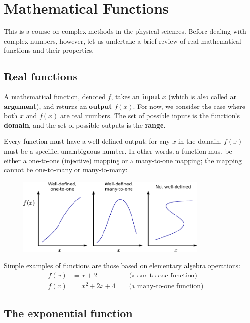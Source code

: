 \documentclass[10pt,a4paper]{article}
\begin{document}
    
\section{Mathematical Functions}
\label{mathematical-functions}

This is a course on complex methods in the physical sciences. Before
dealing with complex numbers, however, let us undertake a brief review
of real mathematical functions and their properties.

\subsection{Real functions}\label{real-functions}

A mathematical function, denoted $f$, takes an \textbf{input} $x$
(which is also called an \textbf{argument}), and returns an
\textbf{output} $f(x)$. For now, we consider the case where both $x$
and $f(x)$ are real numbers. The set of possible inputs is the
function's \textbf{domain}, and the set of possible outputs is the
\textbf{range}.

Every function must have a well-defined output: for any $x$ in the
domain, $f(x)$ must be a specific, unambiguous number. In other words,
a function must be either a one-to-one (injective) mapping or a
many-to-one mapping; the mapping cannot be one-to-many or many-to-many:

\begin{figure}[ht]
  \centering\includegraphics[width=0.85\textwidth]{mathfunctions}
\end{figure}

Simple examples of functions are those based on elementary algebra
operations:
\begin{align}
  f(x) &= x + 2 \,\;\;\qquad\qquad \text{(a one-to-one function)} \\
  f(x) &= x^2 + 2x + 4 \qquad \text{(a many-to-one function)}
\end{align}

\subsection{The exponential function}
\label{exponential_function}
\end{document}
